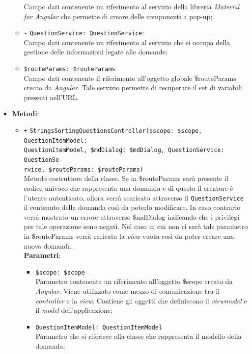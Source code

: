 \begin{itemize}
\begin{itemize}
		Campo dati contenente un riferimento al servizio della libreria \textit{Material for Angular} che permette di creare delle componenti a pop-up;
		\item \texttt{-} \texttt{QuestionService: QuestionService}: \\
		Campo dati contenente un riferimento al servizio che si occupa della gestione delle informazioni legate alle domande;
		\item \texttt{\$routeParams: \$routeParams} \\
		Campo dati contenente il riferimento all'oggetto globale \$routeParams creato da \textit{Angular}. Tale servizio permette di recuperare il set di variabili presenti nell'URL. 
	\end{itemize}
	\item \textbf{Metodi}:
	\begin{itemize}
		\item \texttt{+} \texttt{StringsSortingQuestionsController(\$scope: \$scope, QuestionItemModel:\\ QuestionItemModel, \$mdDialog: \$mdDialog, QuestionService: QuestionSe-\\rvice, \$routeParams: \$routeParams)} \\ 
		Metodo costruttore della classe. Se in \$routeParams sarà presente il codice univoco che rappresenta una domanda e di questa il creatore è l'utente autenticato, allora verrà scaricato attraverso il \texttt{QuestionService} il contenuto della domanda così da poterlo modificare. In caso contrario verrà mostrato un errore attraverso \$mdDialog indicando che i privilegi per tale operazione sono negati. Nel caso in cui non ci sarà tale parametro in \$routeParams verrà caricata la \textit{view} vuota così da poter creare una nuova domanda. \\
		\textbf{Parametri}:
		\begin{itemize}
			\item \texttt{\$scope: \$scope} \\
			Parametro contenente un riferimento all'oggetto \$scope creato da \textit{Angular}. Viene utilizzato come mezzo di comunicazione tra il \textit{controller} e la \textit{view}. Contiene gli oggetti che definiscono il \textit{viewmodel} e il \textit{model} dell'applicazione;
			\item \texttt{QuestionItemModel: QuestionItemModel} \\ 
			Parametro che si riferisce alla classe che rappresenta il modello della domanda;

\end{itemize}
\end{itemize}
\end{itemize}

